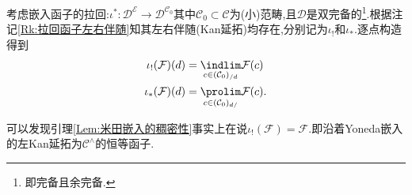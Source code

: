 \begin{remark}\label{Rk:嵌入的Kan延拓}
    考虑嵌入函子的拉回:$\iota^{*} : \mathcal{D}^{\mathcal{E}}\to \mathcal{D}^{\mathcal{C}_0}$其中$\mathcal{C}_0\subset \mathcal{C}$为(小)范畴,且$\mathcal{D}$是双完备的\footnote{即完备且余完备.}.根据注记\ref{Rk:拉回函子左右伴随}知其左右伴随(Kan延拓)均存在,分别记为$\iota_!$和$\iota_*$.逐点构造得到
    \begin{align*}
        \iota_!(\mathcal{F})(d) &= \underset{c\in (\mathcal{C}_0)_{/d}}{\indlim} \mathcal{F}(c)\\
        \iota_*(\mathcal{F})(d) & = \underset{c\in (\mathcal{C}_0)_{d/}}{\prolim}\mathcal{F}(c).
    \end{align*}
\end{remark}
可以发现引理\ref{Lem:米田嵌入的稠密性}事实上在说$\iota_!(\mathcal{F}) = \mathcal{F}$.即沿着Yoneda嵌入的左Kan延拓为$\mathcal{C}^{\land}$的恒等函子.


